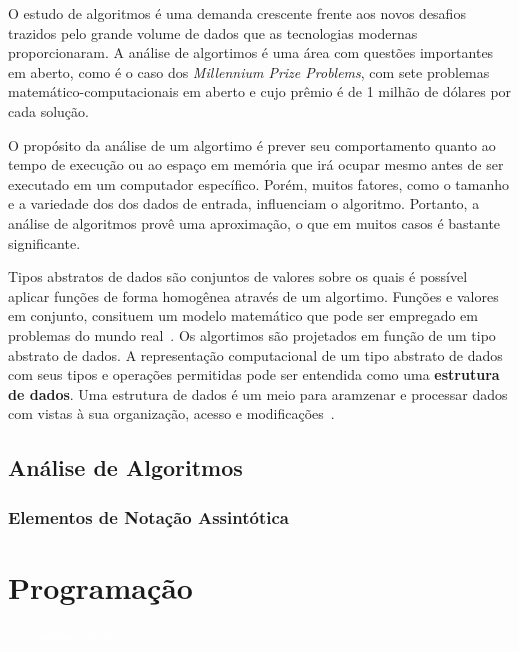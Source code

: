 \documentclass[11pt,fleqn]{book} %
\begin{document}
O estudo de algoritmos é uma demanda crescente frente aos novos desafios trazidos pelo grande volume de dados que as tecnologias modernas proporcionaram.
A análise de algortimos é uma área com questões importantes em aberto, como é o caso dos \textit{Millennium Prize Problems}, com sete problemas matemático-computacionais em aberto e cujo prêmio é de 1 milhão de dólares por cada solução.

O propósito da análise de um algortimo é prever seu comportamento quanto ao tempo de execução ou ao espaço em memória que irá ocupar mesmo antes de ser executado em um computador específico.
Porém, muitos fatores, como o tamanho e a variedade dos dos dados de entrada, influenciam o algoritmo.
Portanto, a análise de algoritmos provê uma aproximação, o que em muitos casos é bastante significante.

Tipos abstratos de dados são conjuntos de valores sobre os quais é possível aplicar funções de forma homogênea através de um algortimo.
Funções e valores em conjunto, consituem um modelo matemático que pode ser empregado em problemas do mundo real~\cite{ascencio2010}.
Os algortimos são projetados em função de um tipo abstrato de dados.
A representação computacional de um tipo abstrato de dados com seus tipos e operações permitidas pode ser entendida como uma \textbf{estrutura de dados}.
Uma estrutura de dados é um meio para aramzenar e processar dados com vistas à sua organização, acesso e modificações~\cite{cormen2009}.

\section{Análise de Algoritmos}\label{sec_analise}

\subsection{Elementos de Notação Assintótica}




\chapter{Programação}\label{programacao}
\vspace{6em}
\begin{flushright}
	\textit{\textcolor{white}{Um bonita citação...}}
\end{flushright}
\vspace{12em}
\end{document}
